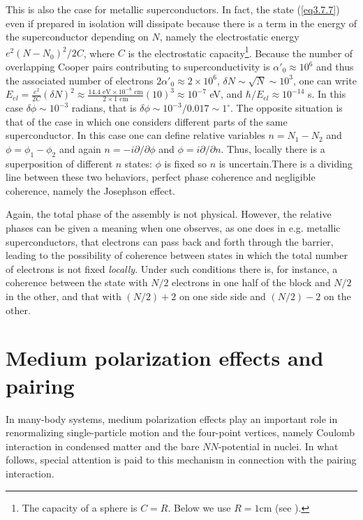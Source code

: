 This is also the case for metallic superconductors. In fact, the state (\ref{eq3.7.7}) even if prepared in isolation will dissipate because there is a term in the energy of the superconductor depending on $N$, namely the electrostatic energy $e^2(N-N_0)^2/2C$, where $C$ is the electrostatic capacity\footnote{The capacity of a sphere is $C=R$. Below we use $R=1$cm (see \cite{Anderson:64b}).}. Because the number of overlapping Cooper pairs contributing to superconductivity is $\alpha'_0\approx10^6$ and thus the associated number of electrons $2\alpha'_0\approx2\times10^6$, $\delta N\sim\sqrt{N}\sim10^3$, one can write $E_{el}=\frac{e^2}{2C}(\delta N)^2\approx\frac{14.4\text{ eV}\times10^{-8}\text{ cm}}{2\times1\text{ cm}}(10)^3\approx10^{-7}$ eV, and $\hbar/E_{el}\approx 10^{-14}$ s.  In this case $\delta\phi\sim10^{-3}$ radians, that is $\delta\phi\sim10^{-3}/0.017\sim1^{\circ}$.   
The opposite situation is that of the case in which one considers different parts of the same superconductor. In this case one can define relative variables $n=N_1-N_2$ and $\phi=\phi_1-\phi_2$ and again $n=-i\partial/\partial \phi$ and $\phi=i\partial/\partial n$. Thus, locally there is a superposition of different $n$ states: $\phi$ is fixed so $n$ is uncertain.There is  a dividing line between these two behaviors, perfect phase coherence and negligible coherence, namely the Josephson effect.


Again, the total phase of the assembly is not physical. However, the relative phases can be given a meaning when one observes, as one does in e.g. metallic superconductors, that electrons can pass back and forth through the barrier, leading to the possibility of coherence between states in which the total number of electrons is not fixed \emph{locally}. Under such conditions there is, for instance, a coherence between the state with $N/2$ electrons in one half of the block and $N/2$ in the other, and that with $(N/2)+2$ on one side side and $(N/2)-2$ on the other.
















\section{Medium polarization effects and pairing}\label{C3AppEx}
In many-body systems, medium polarization effects play an important role in renormalizing single-particle motion and the four-point vertices, namely Coulomb interaction in condensed matter and the bare $NN$-potential in nuclei. In what follows, special attention is paid to this mechanism in connection with the pairing interaction.
